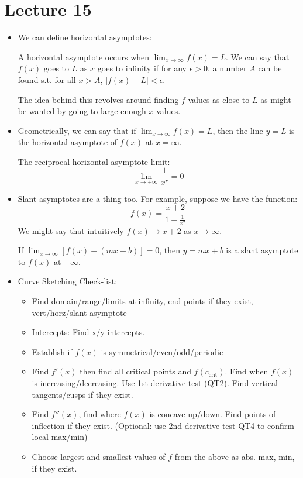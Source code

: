 \section{Lecture 15}
\begin{itemize}
    \item We can define horizontal asymptotes:
    \begin{definition}
        A horizontal asymptote occurs when $\lim_{x\to\infty}f(x)=L$. We can say that 
        $f(x)$ goes to $L$ as $x$ goes to infinity if for any $\epsilon>0$, a number $A$ can be found s.t. for all $x>A$, $|f(x)-L|<\epsilon$.
        \vspace{2mm}

        The idea behind this revolves around finding $f$ values as close to $L$ as might be wanted by going to large enough $x$ values.
    \end{definition}
    \item Geometrically, we can say that if $\displaystyle \lim_{x\to\infty}f(x) = L$, then the line $y=L$ is the horizontal asymptote of $f(x)$ at $x=\infty$.
    \begin{theorem}
        The reciprocal horizontal asymptote limit:
        \begin{equation}
            \lim_{x\to \pm \infty} \frac{1}{x^r} = 0
            \label{eq:}
        \end{equation}
    \end{theorem}
    \item Slant asymptotes are a thing too. For example, suppose we have the function:
    \begin{equation}
        f(x)=\frac{x+2}{1+\frac{1}{x^2}}
        \label{eq:}
    \end{equation}
    We might say that intuitively $f(x)\to x+2$ as $x\to \infty$.
    \begin{definition}
        If $\lim_{x\to \infty} \left[f(x)-(mx+b)\right]=0$, then $y=mx+b$ is a slant asymptote to $f(x)$ at $+\infty$.
    \end{definition}
    \item Curve Sketching Check-list:
    \begin{itemize}
        \item Find domain/range/limits at infinity, end points if they exist, vert/horz/slant asymptote
        \item Intercepts: Find x/y intercepts.
        \item Establish if $f(x)$ is symmetrical/even/odd/periodic
        \item Find $f'(x)$ then find all critical points and $f(c_\text{crit})$. Find when $f(x)$ is increasing/decreasing. Use 1st derivative test (QT2). Find vertical tangents/cusps if they exist.
        \item Find $f''(x)$, find where $f(x)$ is concave up/down. Find points of inflection if they exist. (Optional: use 2nd derivative test QT4 to confirm local max/min)
        \item Choose largest and smallest values of $f$ from the above as abs. max, min, if they exist.
    \end{itemize}
\end{itemize}